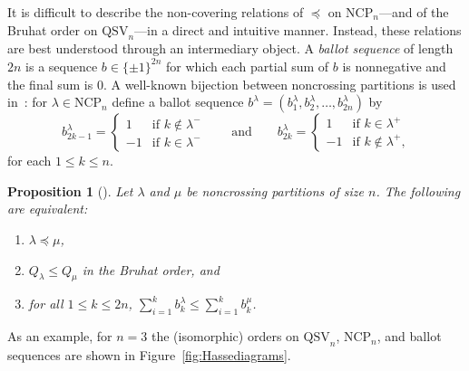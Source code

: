 \documentclass[12pt]{article}
\newtheorem{prop}[equation]{Proposition}
\theoremstyle{definition}
\theoremstyle{remark}
\numberwithin{equation}{section}
\newcommand{\QSV}{\mathrm{QSV}}
\newcommand{\NCP}{\mathrm{NCP}}
\begin{document}
It is difficult to describe the non-covering relations of $\preceq$ on $\NCP_{n}$---and of the Bruhat order on $\QSV_{n}$---in a direct and intuitive manner.  Instead, these relations are best understood through an intermediary object.  A \emph{ballot sequence} of length $2n$ is a sequence $b \in \{\pm1\}^{2n}$ for which each partial sum of $b$ is nonnegative and the final sum is $0$.  A well-known bijection between noncrossing partitions is used in~\cite[Section~5.1]{GobetWilliams}: for $\lambda \in \NCP_{n}$ define a ballot sequence $b^{\lambda} = (b^{\lambda}_{1}, b^{\lambda}_{2}, \ldots, b^{\lambda}_{2n})$  by
\[
b^{\lambda}_{2 k - 1} = \begin{cases} 1 & \text{if $k \notin \lambda^{-}$} \\ -1 & \text{if $k \in \lambda^{-}$} \end{cases}
\qquad
\text{and}
\qquad
b^{\lambda}_{2 k} = \begin{cases} 1 & \text{if $k \in \lambda^{+}$} \\ -1 & \text{if $k \notin \lambda^{+}$,} \end{cases}
\]
for each $1 \le k \le n$.

\begin{prop}[{\cite[Theorem 1.1 and Corollary 7.5]{GobetWilliams}}]
\label{prop:QSVorderbijection}
Let $\lambda$ and $\mu$ be noncrossing partitions of size $n$.  The following are equivalent:
\begin{enumerate}
\item $\lambda \preceq \mu$, 

\item $Q_{\lambda} \le Q_{\mu}$ in the Bruhat order, and

\item for all $1 \le k \le 2n$, $\sum_{i = 1}^{k} b^{\lambda}_{k} \le \sum_{i = 1}^{k} b^{\mu}_{k}$.

\end{enumerate}
\end{prop}

As an example, for $n = 3$ the (isomorphic) orders on $\QSV_{n}$, $\NCP_{n}$, and ballot sequences are shown in Figure~\ref{fig:Hassediagrams}.
\end{document}

